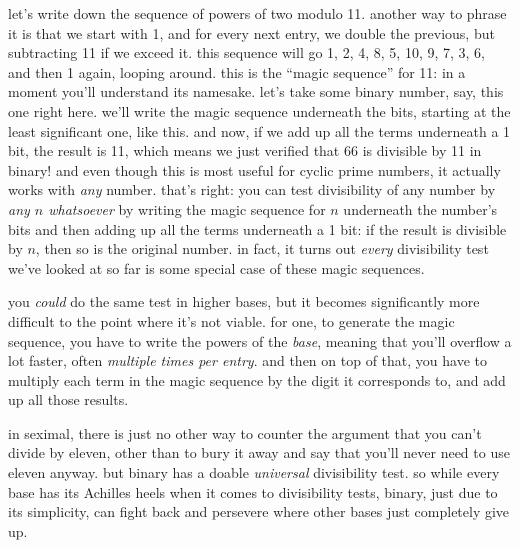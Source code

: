 \documentclass[../best.tex]{subfiles}
\begin{document}
let's write down the sequence of powers of two modulo 11. another way to phrase it is that we start with 1, and for every next entry, we double the previous, but subtracting 11 if we exceed it. this sequence will go 1, 2, 4, 8, 5, 10, 9, 7, 3, 6, and then 1 again, looping around. this is the ``magic sequence'' for 11: in a moment you'll understand its namesake. let's take some binary number, say, this one right here. we'll write the magic sequence underneath the bits, starting at the least significant one, like this. and now, if we add up all the terms underneath a 1 bit, the result is 11, which means we just verified that 66 is divisible by 11 in binary!\myfootnote{} and even though this is most useful for cyclic prime numbers, it actually works with \emph{any} number. that's right: you can test divisibility of any number by \emph{any $n$ whatsoever} by writing the magic sequence for $n$ underneath the number's bits and then adding up all the terms underneath a 1 bit: if the result is divisible by $n$, then so is the original number.\myfootnote{} in fact, it turns out \emph{every} divisibility test we've looked at so far is some special case of these magic sequences.\myfootnote{}

you \emph{could} do the same test in higher bases, but it becomes significantly more difficult to the point where it's not viable. for one, to generate the magic sequence, you have to write the powers of the \emph{base}, meaning that you'll overflow a lot faster, often \emph{multiple times per entry}. and then on top of that, you have to multiply each term in the magic sequence by the digit it corresponds to, and add up all those results.\myfootnote{}

in seximal, there is just no other way to counter the argument that you can't divide by eleven, other than to bury it away and say that you'll never need to use eleven anyway. but binary has a doable \emph{universal} divisibility test. so while every base has its Achilles heels when it comes to divisibility tests, binary, just due to its simplicity, can fight back and persevere where other bases just completely give up.
\end{document}
